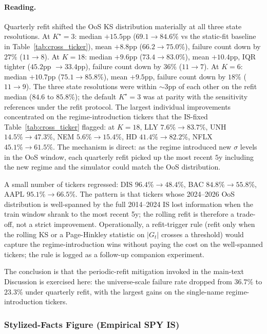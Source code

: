 \paragraph{Reading.}
Quarterly refit shifted the OoS KS distribution materially at all three state resolutions. At $K^\star = 3$: median $+15.5$pp ($69.1 \to 84.6\%$ vs the static-fit baseline in Table~\ref{tab:cross_ticker}), mean $+8.8$pp ($66.2 \to 75.0\%$), failure count down by $27\%$ ($11 \to 8$). At $K = 18$: median $+9.6$pp ($73.4 \to 83.0\%$), mean $+10.4$pp, IQR tighter ($45.2$pp $\to 33.4$pp), failure count down by $36\%$ ($11 \to 7$). At $K = 6$: median $+10.7$pp ($75.1 \to 85.8\%$), mean $+9.5$pp, failure count down by $18\%$ ($11 \to 9$). The three state resolutions were within $\sim 3$pp of each other on the refit median ($84.6$ to $85.8\%$); the default $K^\star = 3$ was at parity with the sensitivity references under the refit protocol. The largest individual improvements concentrated on the regime-introduction tickers that the IS-fixed Table~\ref{tab:cross_ticker} flagged: at $K = 18$, LLY $7.6\% \to 83.7\%$, UNH $14.5\% \to 47.3\%$, NEM $5.6\% \to 15.4\%$, HD $41.4\% \to 82.2\%$, NFLX $45.1\% \to 61.5\%$. The mechanism is direct: as the regime introduced new $\sigma$ levels in the OoS window, each quarterly refit picked up the most recent $5$y including the new regime and the simulator could match the OoS distribution.

A small number of tickers regressed: DIS $96.4\% \to 48.4\%$, BAC $84.8\% \to 55.8\%$, AAPL $95.1\% \to 66.5\%$. The pattern is that tickers whose 2024--2026 OoS distribution is well-spanned by the full 2014--2024 IS lost information when the train window shrank to the most recent 5y; the rolling refit is therefore a trade-off, not a strict improvement. Operationally, a refit-trigger rule (refit only when the rolling KS or a Page-Hinkley statistic on $|G_t|$ crosses a threshold) would capture the regime-introduction wins without paying the cost on the well-spanned tickers; the rule is logged as a follow-up companion experiment.

The conclusion is that the periodic-refit mitigation invoked in the main-text Discussion is exercised here: the universe-scale failure rate dropped from $36.7\%$ to $23.3\%$ under quarterly refit, with the largest gains on the single-name regime-introduction tickers.

\subsubsection{Stylized-Facts Figure (Empirical SPY IS)}
\label{sec:supp_stylized_facts}

